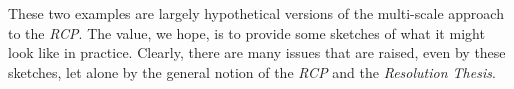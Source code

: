 \documentclass{article}
\begin{document}




These two examples are largely hypothetical versions of the multi-scale approach to the \textit{RCP}.  The value, we hope, is to provide some sketches of what it might look like in practice.  Clearly, there are many issues that are raised, even by these sketches, let alone by the general notion of the \textit{RCP} and the \textit{Resolution Thesis}. 


\end{document}

